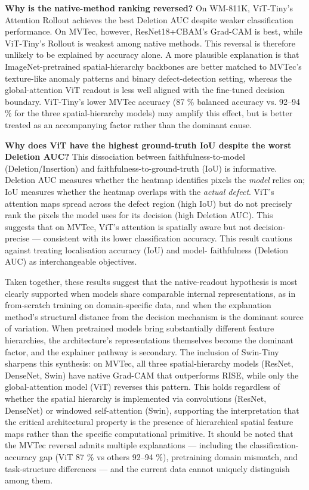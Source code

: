 \documentclass[11pt,a4paper]{article}
\begin{document}
\textbf{Why is the native-method ranking reversed?} On WM-811K, ViT-Tiny's Attention Rollout achieves the best Deletion AUC despite weaker classification performance. On MVTec, however, ResNet18+CBAM's Grad-CAM is best, while ViT-Tiny's Rollout is weakest among native methods. This reversal is therefore unlikely to be explained by accuracy alone. A more plausible explanation is that ImageNet-pretrained spatial-hierarchy backbones are better matched to MVTec's texture-like anomaly patterns and binary defect-detection setting, whereas the global-attention ViT readout is less well aligned with the fine-tuned decision boundary. ViT-Tiny's lower MVTec accuracy (87 \% balanced accuracy vs. 92--94 \% for the three spatial-hierarchy models) may amplify this effect, but is better treated as an accompanying factor rather than the dominant cause.

\textbf{Why does ViT have the highest ground-truth IoU despite the worst Deletion AUC?} This dissociation between faithfulness-to-model (Deletion/Insertion) and faithfulness-to-ground-truth (IoU) is informative. Deletion AUC measures whether the heatmap identifies pixels the \emph{model} relies on; IoU measures whether the heatmap overlaps with the \emph{actual defect}. ViT's attention maps spread across the defect region (high IoU) but do not precisely rank the pixels the model uses for its decision (high Deletion AUC). This suggests that on MVTec, ViT's attention is spatially aware but not decision-precise --- consistent with its lower classification accuracy. This result cautions against treating localisation accuracy (IoU) and model- faithfulness (Deletion AUC) as interchangeable objectives.

Taken together, these results suggest that the native-readout hypothesis is most clearly supported when models share comparable internal representations, as in from-scratch training on domain-specific data, and when the explanation method's structural distance from the decision mechanism is the dominant source of variation. When pretrained models bring substantially different feature hierarchies, the architecture's representations themselves become the dominant factor, and the explainer pathway is secondary. The inclusion of Swin-Tiny sharpens this synthesis: on MVTec, all three spatial-hierarchy models (ResNet, DenseNet, Swin) have native Grad-CAM that outperforms RISE, while only the global-attention model (ViT) reverses this pattern. This holds regardless of whether the spatial hierarchy is implemented via convolutions (ResNet, DenseNet) or windowed self-attention (Swin), supporting the interpretation that the critical architectural property is the presence of hierarchical spatial feature maps rather than the specific computational primitive. It should be noted that the MVTec reversal admits multiple explanations --- including the classification-accuracy gap (ViT 87 \% vs others 92--94 \%), pretraining domain mismatch, and task-structure differences --- and the current data cannot uniquely distinguish among them.
\end{document}
